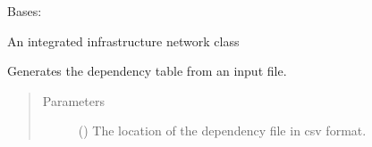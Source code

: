 \documentclass[letterpaper,10pt,english]{sphinxmanual}
\begin{document}
\begin{fulllineitems}
\label{\detokenize{apidoc:dreaminsg_integrated_model.src.network_sim_models.integrated_network.IntegratedNetwork}}
\sphinxAtStartPar
Bases: {\hyperref[\detokenize{apidoc:dreaminsg_integrated_model.src.network_sim_models.integrated_network.Network}]{}}

\sphinxAtStartPar
An integrated infrastructure network class

\begin{fulllineitems}
\label{\detokenize{apidoc:dreaminsg_integrated_model.src.network_sim_models.integrated_network.IntegratedNetwork.generate_dependency_table}}
\sphinxAtStartPar
Generates the dependency table from an input file.
\begin{quote}\begin{description}
\item[{Parameters}] \leavevmode
\sphinxAtStartPar
{} () \textendash{} The location of the dependency file in csv format.

\end{description}\end{quote}

\end{fulllineitems}



\end{fulllineitems}
\end{document}
